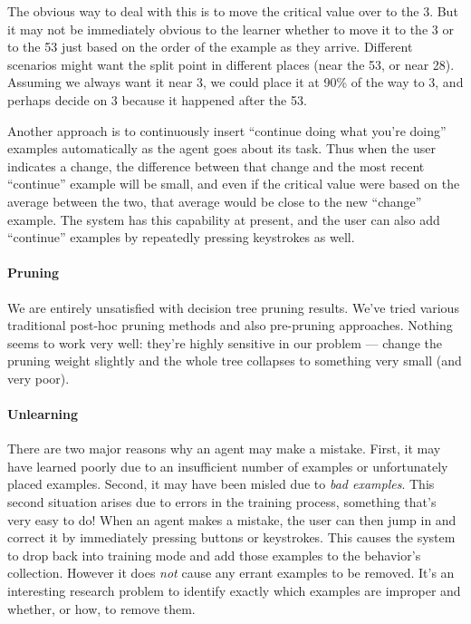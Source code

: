 \documentclass[11pt]{article}
\begin{document}
The obvious way to deal with this is to move the critical value over to the 3.  But it may not be immediately obvious to the learner whether to move it to the 3 or to the 53 just based on the order of the example as they arrive.   Different scenarios might want the split point in different places (near the 53, or near 28).  Assuming we always want it near 3, we could place it at 90\% of the way to 3, and perhaps decide on 3 because it happened after the 53.

Another approach is to continuously insert ``continue doing what you're doing'' examples automatically as the agent goes about its task.  Thus when the user indicates a change, the difference between that change and the most recent ``continue'' example will be small, and even if the critical value were based on the average between the two, that average would be close to the new ``change'' example.  The system has this capability at present, and the user can also add ``continue'' examples by repeatedly pressing keystrokes as well.

\paragraph{Pruning}  We are entirely unsatisfied with decision tree pruning results.  We've tried various traditional post-hoc pruning methods and also pre-pruning approaches.  Nothing seems to work very well: they're highly sensitive in our problem --- change the pruning weight slightly and the whole tree collapses to something very small (and very poor).

\paragraph{Unlearning} There are two major reasons why an agent may make a mistake.  First, it may have learned poorly due to an insufficient number of examples or unfortunately placed examples.  Second, it may have been misled due to {\it bad examples}.  This second situation arises due to errors in the training process, something that's very easy to do!  When an agent makes a mistake, the user can then jump in and correct it by immediately pressing buttons or keystrokes.  This causes the system to drop back into training mode and add those examples to the behavior's collection.  However it does {\it not} cause any errant examples to be removed.  It's an interesting research problem to identify exactly which examples are improper and whether, or how, to remove them.
\end{document}
